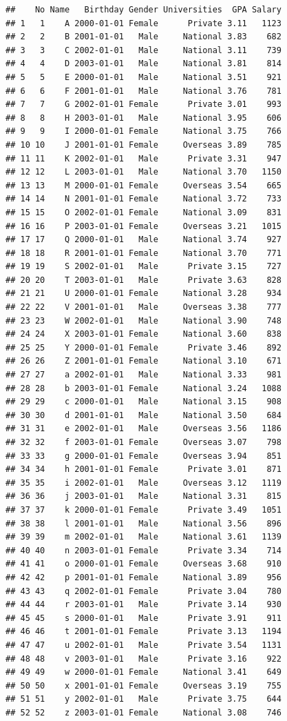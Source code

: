\documentclass[
]{book}
\begin{document}
\begin{verbatim}
##    No Name   Birthday Gender Universities  GPA Salary
## 1   1    A 2000-01-01 Female      Private 3.11   1123
## 2   2    B 2001-01-01   Male     National 3.83    682
## 3   3    C 2002-01-01   Male     National 3.11    739
## 4   4    D 2003-01-01   Male     National 3.81    814
## 5   5    E 2000-01-01   Male     National 3.51    921
## 6   6    F 2001-01-01   Male     National 3.76    781
## 7   7    G 2002-01-01 Female      Private 3.01    993
## 8   8    H 2003-01-01   Male     National 3.95    606
## 9   9    I 2000-01-01 Female     National 3.75    766
## 10 10    J 2001-01-01 Female     Overseas 3.89    785
## 11 11    K 2002-01-01   Male      Private 3.31    947
## 12 12    L 2003-01-01   Male     National 3.70   1150
## 13 13    M 2000-01-01 Female     Overseas 3.54    665
## 14 14    N 2001-01-01 Female     National 3.72    733
## 15 15    O 2002-01-01 Female     National 3.09    831
## 16 16    P 2003-01-01 Female     Overseas 3.21   1015
## 17 17    Q 2000-01-01   Male     National 3.74    927
## 18 18    R 2001-01-01 Female     National 3.70    771
## 19 19    S 2002-01-01   Male      Private 3.15    727
## 20 20    T 2003-01-01   Male      Private 3.63    828
## 21 21    U 2000-01-01 Female     National 3.28    934
## 22 22    V 2001-01-01   Male     Overseas 3.38    777
## 23 23    W 2002-01-01   Male     National 3.90    748
## 24 24    X 2003-01-01 Female     National 3.60    838
## 25 25    Y 2000-01-01 Female      Private 3.46    892
## 26 26    Z 2001-01-01 Female     National 3.10    671
## 27 27    a 2002-01-01   Male     National 3.33    981
## 28 28    b 2003-01-01 Female     National 3.24   1088
## 29 29    c 2000-01-01   Male     National 3.15    908
## 30 30    d 2001-01-01   Male     National 3.50    684
## 31 31    e 2002-01-01   Male     Overseas 3.56   1186
## 32 32    f 2003-01-01 Female     Overseas 3.07    798
## 33 33    g 2000-01-01 Female     Overseas 3.94    851
## 34 34    h 2001-01-01 Female      Private 3.01    871
## 35 35    i 2002-01-01   Male     Overseas 3.12   1119
## 36 36    j 2003-01-01   Male     National 3.31    815
## 37 37    k 2000-01-01 Female      Private 3.49   1051
## 38 38    l 2001-01-01   Male     National 3.56    896
## 39 39    m 2002-01-01   Male     National 3.61   1139
## 40 40    n 2003-01-01 Female      Private 3.34    714
## 41 41    o 2000-01-01 Female     Overseas 3.68    910
## 42 42    p 2001-01-01 Female     National 3.89    956
## 43 43    q 2002-01-01 Female      Private 3.04    780
## 44 44    r 2003-01-01   Male      Private 3.14    930
## 45 45    s 2000-01-01   Male      Private 3.91    911
## 46 46    t 2001-01-01 Female      Private 3.13   1194
## 47 47    u 2002-01-01   Male      Private 3.54   1131
## 48 48    v 2003-01-01   Male      Private 3.16    922
## 49 49    w 2000-01-01 Female     National 3.41    649
## 50 50    x 2001-01-01 Female     Overseas 3.19    755
## 51 51    y 2002-01-01   Male      Private 3.75    644
## 52 52    z 2003-01-01 Female     National 3.08    746
\end{verbatim}
\end{document}
